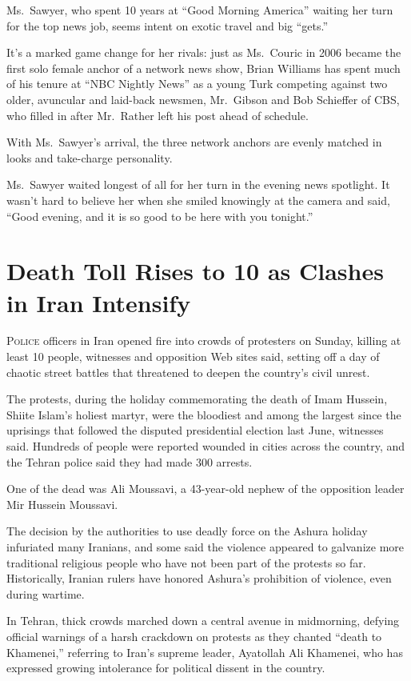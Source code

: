 ﻿\documentclass[12pt]{article}
\begin{document}
Ms.~Sawyer, who spent 10 years at ``Good Morning America'' waiting her turn for the top news job,
seems intent on exotic travel and big ``gets.''

It's a marked game change for her rivals: just as Ms.~Couric in 2006 became the first solo female
anchor of a network news show, Brian Williams has spent much of his tenure at ``NBC Nightly News''
as a young Turk competing against two older, avuncular and laid-back newsmen, Mr.~Gibson and Bob
Schieffer of CBS, who filled in after Mr.~Rather left his post ahead of schedule.

With Ms.~Sawyer's arrival, the three network anchors are evenly matched in looks and take-charge
personality.

Ms.~Sawyer waited longest of all for her turn in the evening news spotlight. It wasn't hard to
believe her when she smiled knowingly at the camera and said, ``Good evening, and it is so good to
be here with you tonight.''

\section{Death Toll Rises to 10 as Clashes in Iran Intensify}

\lettrine{P}{olice} officers in Iran opened fire into crowds of protesters
on Sunday, killing at least 10 people, witnesses and opposition Web sites said, setting off a day of
chaotic street battles that threatened to deepen the country's civil unrest.

The protests, during the holiday commemorating the death of Imam Hussein, Shiite Islam's holiest
martyr, were the bloodiest and among the largest since the uprisings that followed the disputed
presidential election last June, witnesses said. Hundreds of people were reported wounded in cities
across the country, and the Tehran police said they had made 300 arrests.

One of the dead was Ali Moussavi, a 43-year-old nephew of the opposition leader Mir Hussein
Moussavi.

The decision by the authorities to use deadly force on the Ashura holiday infuriated many Iranians,
and some said the violence appeared to galvanize more traditional religious people who have not been
part of the protests so far. Historically, Iranian rulers have honored Ashura's prohibition of
violence, even during wartime.

In Tehran, thick crowds marched down a central avenue in midmorning, defying official warnings of a
harsh crackdown on protests as they chanted ``death to Khamenei,'' referring to Iran's supreme
leader, Ayatollah Ali Khamenei, who has expressed growing intolerance for political dissent in the
country.
\end{document}

